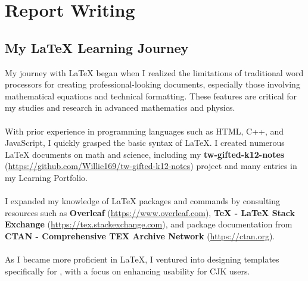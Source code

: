 \documentclass[a4paper,12pt]{article}
\begin{document}
\section{Report Writing}
\subsection{My \LaTeX{} Learning Journey}
My journey with \LaTeX{} began when I realized the limitations of traditional word processors for creating professional-looking documents, especially those involving mathematical equations and technical formatting. These features are critical for my studies and research in advanced mathematics and physics.\\\\
With prior experience in programming languages such as HTML, C++, and JavaScript, I quickly grasped the basic syntax of \LaTeX. I created numerous \LaTeX{} documents on math and science, including my \textbf{tw-gifted-k12-notes} (\href{https://github.com/Willie169/tw-gifted-k12-notes}{https://github.com/Willie169/tw-gifted-k12-notes}) project and many entries in my Learning Portfolio.\\\\
I expanded my knowledge of \LaTeX{} packages and commands by consulting resources such as \textbf{Overleaf} (\href{https://www.overleaf.com}{https://www.overleaf.com}), \textbf{TeX - LaTeX Stack Exchange} (\href{https://tex.stackexchange.com}{https://tex.stackexchange.com}), and package documentation from \textbf{CTAN - Comprehensive TEX Archive Network} (\href{https://ctan.org}{https://ctan.org}).\\\\
As I became more proficient in \LaTeX, I ventured into designing templates specifically for \XeTeX, with a focus on enhancing usability for CJK users.
\end{document}
